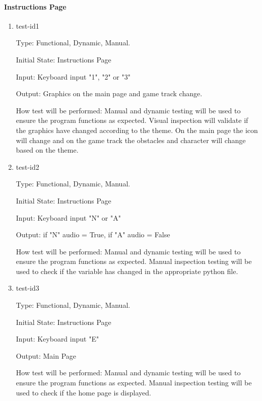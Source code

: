 \documentclass[12pt, titlepage]{article}
\begin{document}
\paragraph{Instructions Page}

\begin{enumerate}
	
	\item{test-id1\\}
	
	Type: Functional, Dynamic, Manual. 
	
	Initial State: Instructions Page
	
	Input: Keyboard input "1", "2" or "3" 
	
	Output: Graphics on the main page and game track change. 
	
	How test will be performed: Manual and dynamic testing will be used to ensure the program functions as expected. Visual inspection will validate if the graphics have changed according to the theme. On the main page the icon will change and on the game track the obstacles and character will change based on the theme. 
	
	\item{test-id2\\}
	
	Type: Functional, Dynamic, Manual.
	
	Initial State: Instructions Page
	
	Input: Keyboard input "N" or "A" 
	
	Output: if "N" audio = True, if "A" audio = False
	
	How test will be performed: Manual and dynamic testing will be used to ensure the program functions as expected. Manual inspection testing will be used to check if the variable has changed in the appropriate python file. 
	
	\item{test-id3\\}
	
	Type: Functional, Dynamic, Manual.
	
	Initial State: Instructions Page
	
	Input: Keyboard input "E"
	
	Output: Main Page
	
	How test will be performed: Manual and dynamic testing will be used to ensure the program functions as expected. Manual inspection testing will be used to check if the home page is displayed. 
	
\end{enumerate}
\end{document}
